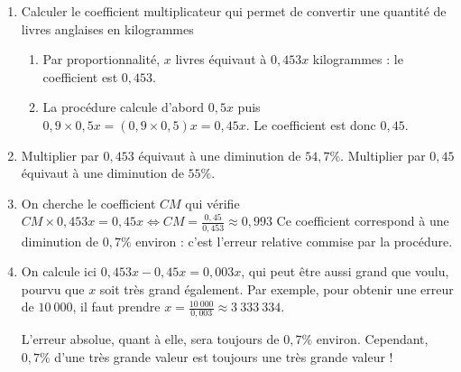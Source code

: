 {\begin{enumerate}
		\item 
		Calculer le coefficient multiplicateur qui permet de convertir une quantité de livres anglaises en kilogrammes
			\begin{enumerate}[label=(\alph*)]
				\item 
				Par proportionnalité, $x$ livres équivaut à $0,453x$ kilogrammes : le coefficient est $0,453$.
				\item
				La procédure calcule d'abord $0,5x$ puis $0,9 \times 0,5 x = (0,9 \times 0,5) x = 0,45x$.
				Le coefficient est donc $0,45$.
			\end{enumerate}
		\item
		Multiplier par $0,453$ équivaut à une diminution de $54,7\%$.
		Multiplier par $0,45$ équivaut à une diminution de $55\%$.
		\item
		On cherche le coefficient $CM$ qui vérifie $CM \times 0,453x = 0,45x \iff CM = \frac{0,45}{0,453} \approx 0,993$
		Ce coefficient correspond à une diminution de $0,7\%$ environ : c'est l'erreur relative commise par la procédure.
		\item
		On calcule ici $0,453x - 0,45x = 0,003x$, qui peut être aussi grand que voulu, pourvu que $x$ soit très grand également.
		Par exemple, pour obtenir une erreur de $10~000$, il faut prendre $x=\frac{10~000}{0,003} \approx 3~333~334$.
		
		L'erreur absolue, quant à elle, sera toujours de $0,7\%$ environ.
		Cependant, $0,7\%$ d'une très grande valeur est toujours une très grande valeur !
	\end{enumerate}
}


